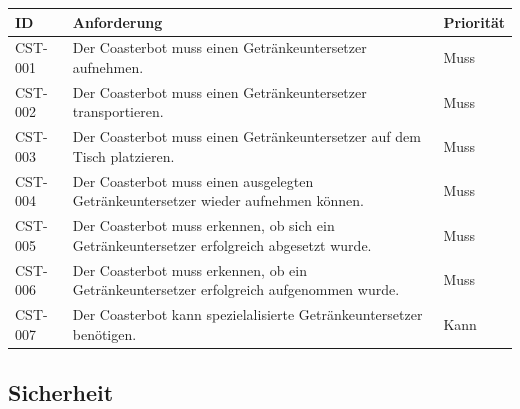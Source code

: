 \begin{longtable}[]{@{}
  >{\raggedright\arraybackslash}p{}
  >{\raggedright\arraybackslash}p{}
  >{\raggedright\arraybackslash}p{}@{}}
\toprule\noalign{}
\begin{minipage}[b]{\linewidth}\raggedright
ID
\end{minipage} & \begin{minipage}[b]{\linewidth}\raggedright
Anforderung
\end{minipage} & \begin{minipage}[b]{\linewidth}\raggedright
Priorität
\end{minipage} \\
\midrule\noalign{}
\endhead
\bottomrule\noalign{}
\endlastfoot
CST-001 & Der Coasterbot muss einen Getränkeuntersetzer aufnehmen. &
Muss \\
CST-002 & Der Coasterbot muss einen Getränkeuntersetzer transportieren.
& Muss \\
CST-003 & Der Coasterbot muss einen Getränkeuntersetzer auf dem Tisch
platzieren. & Muss \\
CST-004 & Der Coasterbot muss einen ausgelegten Getränkeuntersetzer
wieder aufnehmen können. & Muss \\
CST-005 & Der Coasterbot muss erkennen, ob sich ein Getränkeuntersetzer
erfolgreich abgesetzt wurde. & Muss \\
CST-006 & Der Coasterbot muss erkennen, ob ein Getränkeuntersetzer
erfolgreich aufgenommen wurde. & Muss \\
CST-007 & Der Coasterbot kann spezielalisierte Getränkeuntersetzer
benötigen. & Kann \\
\end{longtable}

\subsection{Sicherheit}\label{sicherheit}

